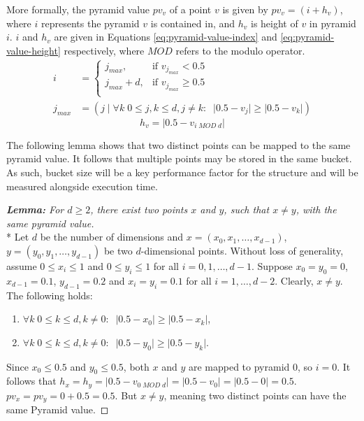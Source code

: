 More formally, the pyramid value $pv_v$ of a point $v$ is given by $pv_v = (i + h_v)$, where $i$ represents the pyramid $v$ is contained in, and $h_v$ is height of $v$ in pyramid $i$. $i$ and $h_v$ are given in Equations \ref{eq:pyramid-value-index} and \ref{eq:pyramid-value-height} respectively, where $MOD$ refers to the modulo operator.
\begin{align}
	i &= \begin{cases}
		j_{max},         & \text{if }v_{j_{max}} < 0.5\\
		j_{max} + d,   & \text{if }v_{j_{max}} \geq 0.5\\
	\end{cases}
	\label{eq:pyramid-value-index}
	\\
	j_{max} &= \left( j \;|\; \forall k \; 0 \leq j,k \leq d, j \neq k: \;\; \lvert 0.5 - v_j \rvert \geq \lvert 0.5 - v_k \rvert \right) \nonumber
\end{align}
\begin{equation}
	h_v = \lvert 0.5 - v_{i \; MOD \; d} \rvert
	\label{eq:pyramid-value-height}
\end{equation}

The following lemma shows that two distinct points can be mapped to the same pyramid value. It follows that multiple points may be stored in the same bucket. As such, bucket size will be a key performance factor for the structure and will be measured alongside execution time.

\vspace{22pt}

\begin{proof}[\textbf{Lemma: } For $d \geq 2$, there exist two points $x$ and $y$, such that $x \neq y$, with the same pyramid value]\mbox{}\\*
Let $d$ be the number of dimensions and $x = (x_0, x_1, \dots, x_{d -1})$, $y = (y_0, y_1, \dots, y_{d - 1})$ be two $d$-dimensional points. Without loss of generality, assume $0 \leq x_i \leq 1$ and $0 \leq y_i \leq 1$ for all $i = 0, 1, \dots, d - 1$. Suppose $x_0 = y_0 = 0$, $x_{d - 1} = 0.1$, $y_{d - 1} = 0.2$ and $x_i = y_i = 0.1$ for all $i = 1, \dots, {d - 2}$. Clearly, $x \neq y$. The following holds:

\begin{enumerate}
	\item $\forall k \; 0 \leq k \leq d, k \neq 0: \;\; \lvert 0.5 - x_0 \rvert \geq \lvert 0.5 - x_k \rvert$,
	\item $\forall k \; 0 \leq k \leq d, k \neq 0: \;\; \lvert 0.5 - y_0 \rvert \geq \lvert 0.5 - y_k \rvert$.
\end{enumerate}

Since $x_0 \leq 0.5$ and $y_0 \leq 0.5$, both $x$ and $y$ are mapped to pyramid 0, so $i = 0$. It follows that $h_x = h_y = \lvert 0.5 - v_{0 \; MOD \; d} \rvert = \lvert 0.5 - v_{0} \rvert = \lvert 0.5 - 0 \rvert = 0.5$. $pv_x = pv_y = 0 + 0.5 = 0.5$. But $x \neq y$, meaning two distinct points can have the same Pyramid value.

\end{proof}

